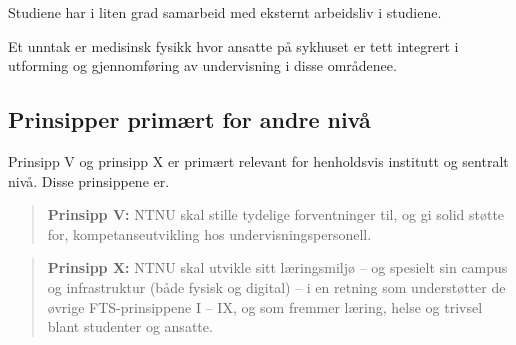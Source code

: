 Studiene har i liten grad samarbeid med eksternt arbeidsliv i studiene.

Et unntak er medisinsk fysikk hvor ansatte på sykhuset er tett integrert i utforming og gjennomføring av undervisning i disse områdenee.

\subsection{Prinsipper primært for andre nivå}

Prinsipp V og prinsipp X er primært relevant for henholdsvis institutt og sentralt nivå. Disse prinsippene er.

\begin{quote}
	\textbf{Prinsipp V:} NTNU skal stille tydelige forventninger til, og gi solid støtte for, kompetanseutvikling hos undervisningspersonell.
\end{quote}

\begin{quote}
	\textbf{Prinsipp X:} NTNU skal utvikle sitt læringsmiljø – og spesielt sin campus og infrastruktur (både fysisk og digital) – i en retning som understøtter de øvrige FTS-prinsippene I – IX, og som fremmer læring, helse og trivsel blant studenter og ansatte.
\end{quote}


